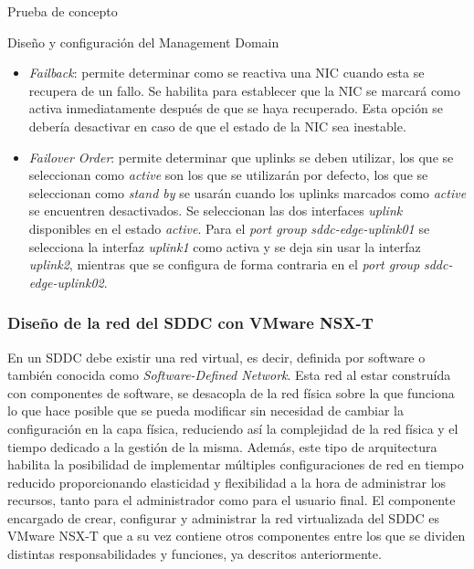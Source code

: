 \begin{section}{Prueba de concepto}
\begin{subsection}{Diseño y configuración del Management Domain}
\begin{itemize}
      \item \textit{Failback}: permite determinar como se reactiva una NIC cuando esta se recupera de un fallo. Se habilita para establecer que la NIC se marcará como activa inmediatamente después de que se haya recuperado. Esta opción se debería desactivar en caso de que el estado de la NIC sea inestable.
      
      \item \textit{Failover Order}: permite determinar que uplinks se deben utilizar, los que se seleccionan como \textit{active} son los que se utilizarán por defecto, los que se seleccionan como \textit{stand by} se usarán cuando los uplinks marcados como \textit{active} se encuentren desactivados. Se seleccionan las dos interfaces \textit{uplink} disponibles en el estado \textit{active}. Para el \textit{port group} \textit{sddc-edge-uplink01} se selecciona la interfaz \textit{uplink1} como activa y se deja sin usar la interfaz \textit{uplink2}, mientras que se configura de forma contraria en el \textit{port group} \textit{sddc-edge-uplink02}.
    \end{itemize}
    
    
    \subsubsection{Diseño de la red del SDDC con VMware NSX-T}
    En un SDDC debe existir una red virtual, es decir, definida por software o también conocida como \textit{Software-Defined Network}. Esta red al estar construída con componentes de software, se desacopla de la red física sobre la que funciona lo que hace posible que se pueda modificar sin necesidad de cambiar la configuración en la capa física, reduciendo así la complejidad de la red física y el tiempo dedicado a la gestión de la misma. Además, este tipo de arquitectura habilita la posibilidad de implementar múltiples configuraciones de red en tiempo reducido proporcionando elasticidad y flexibilidad a la hora de administrar los recursos, tanto para el administrador como para el usuario final.
    El componente encargado de crear, configurar y administrar la red virtualizada del SDDC es VMware NSX-T que a su vez contiene otros componentes entre los que se dividen distintas responsabilidades y funciones, ya descritos anteriormente.
    
    

\end{subsection}
\end{section}
